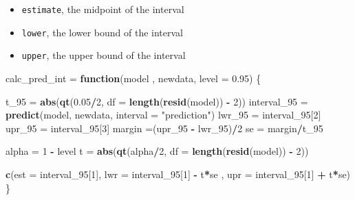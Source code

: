 \documentclass[
]{article}
\newenvironment{Shaded}{\begin{snugshade}}{\end{snugshade}}
\newcommand{\ControlFlowTok}[1]{\textcolor[rgb]{0.13,0.29,0.53}{\textbf{#1}}}
\newcommand{\DataTypeTok}[1]{\textcolor[rgb]{0.13,0.29,0.53}{#1}}
\newcommand{\DecValTok}[1]{\textcolor[rgb]{0.00,0.00,0.81}{#1}}
\newcommand{\FloatTok}[1]{\textcolor[rgb]{0.00,0.00,0.81}{#1}}
\newcommand{\KeywordTok}[1]{\textcolor[rgb]{0.13,0.29,0.53}{\textbf{#1}}}
\newcommand{\NormalTok}[1]{#1}
\newcommand{\OperatorTok}[1]{\textcolor[rgb]{0.81,0.36,0.00}{\textbf{#1}}}
\newcommand{\StringTok}[1]{\textcolor[rgb]{0.31,0.60,0.02}{#1}}
\providecommand{\tightlist}{%
  \setlength{\itemsep}{0pt}\setlength{\parskip}{0pt}}
\begin{document}
\begin{itemize}
\tightlist
\item
  \texttt{estimate}, the midpoint of the interval
\item
  \texttt{lower}, the lower bound of the interval
\item
  \texttt{upper}, the upper bound of the interval
\end{itemize}

\begin{Shaded}
\begin{Highlighting}[]
\NormalTok{calc_pred_int =}\StringTok{ }\ControlFlowTok{function}\NormalTok{(model , newdata, }\DataTypeTok{level =} \FloatTok{0.95}\NormalTok{) \{}
  
\NormalTok{  t_}\DecValTok{95}\NormalTok{ =}\StringTok{ }\KeywordTok{abs}\NormalTok{(}\KeywordTok{qt}\NormalTok{(}\FloatTok{0.05}\OperatorTok{/}\DecValTok{2}\NormalTok{, }\DataTypeTok{df =} \KeywordTok{length}\NormalTok{(}\KeywordTok{resid}\NormalTok{(model)) }\OperatorTok{-}\StringTok{ }\DecValTok{2}\NormalTok{))}
\NormalTok{  interval_}\DecValTok{95}\NormalTok{ =}\StringTok{ }\KeywordTok{predict}\NormalTok{(model, newdata, }\DataTypeTok{interval =} \StringTok{"prediction"}\NormalTok{)}
\NormalTok{  lwr_}\DecValTok{95}\NormalTok{ =}\StringTok{ }\NormalTok{interval_}\DecValTok{95}\NormalTok{[}\DecValTok{2}\NormalTok{]}
\NormalTok{  upr_}\DecValTok{95}\NormalTok{ =}\StringTok{ }\NormalTok{interval_}\DecValTok{95}\NormalTok{[}\DecValTok{3}\NormalTok{]}
\NormalTok{  margin =(upr_}\DecValTok{95} \OperatorTok{-}\StringTok{ }\NormalTok{lwr_}\DecValTok{95}\NormalTok{)}\OperatorTok{/}\DecValTok{2}
\NormalTok{  se =}\StringTok{ }\NormalTok{margin}\OperatorTok{/}\NormalTok{t_}\DecValTok{95}

\NormalTok{  alpha =}\StringTok{ }\DecValTok{1} \OperatorTok{-}\StringTok{ }\NormalTok{level}
\NormalTok{  t =}\StringTok{ }\KeywordTok{abs}\NormalTok{(}\KeywordTok{qt}\NormalTok{(alpha}\OperatorTok{/}\DecValTok{2}\NormalTok{, }\DataTypeTok{df =} \KeywordTok{length}\NormalTok{(}\KeywordTok{resid}\NormalTok{(model)) }\OperatorTok{-}\StringTok{ }\DecValTok{2}\NormalTok{))}
  
  \KeywordTok{c}\NormalTok{(}\DataTypeTok{est =}\NormalTok{ interval_}\DecValTok{95}\NormalTok{[}\DecValTok{1}\NormalTok{], }\DataTypeTok{lwr =}\NormalTok{ interval_}\DecValTok{95}\NormalTok{[}\DecValTok{1}\NormalTok{] }\OperatorTok{-}\StringTok{ }\NormalTok{t}\OperatorTok{*}\NormalTok{se , }\DataTypeTok{upr =}\NormalTok{ interval_}\DecValTok{95}\NormalTok{[}\DecValTok{1}\NormalTok{] }\OperatorTok{+}\StringTok{ }\NormalTok{t}\OperatorTok{*}\NormalTok{se)}
\NormalTok{\}}
\end{Highlighting}
\end{Shaded}
\end{document}
